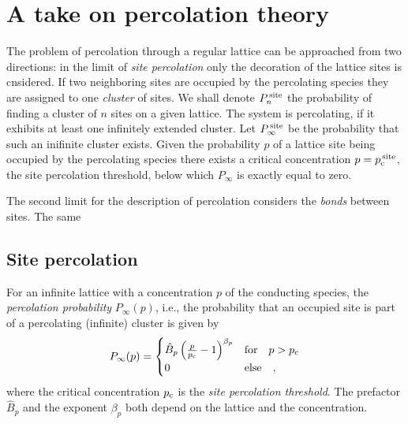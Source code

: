 \documentclass{scrartcl}
\begin{document}
\section{A take on percolation theory}

The problem of percolation through a regular lattice can be approached
from two directions: 
%
in the limit of \emph{site percolation} only the decoration of the
lattice sites is cnsidered.  If two neighboring sites are occupied by
the percolating species they are assigned to one \emph{cluster} of
sites.  We shall denote $P_{n}^{\,\textup{site}}$ the probability of
finding a cluster of $n$ sites on a given lattice.  The system is
percolating, if it exhibits at least one infinitely extended cluster.
%
Let $P_{\infty}^{\,\textup{site}}$ be the probability that such an
inifinite cluster exists.
%
Given the probability $p$ of a lattice site being occupied by the
percolating species there exists a critical concentration $p =
p_{\textup{c}}^{\,\textup{site}}$, the site percolation threshold, below
which $P_{\infty}$ is exactly equal to zero.

The second limit for the description of percolation considers the
\emph{bonds} between sites.  The same 


\subsection{Site percolation}

For an infinite lattice with a concentration $p$ of the conducting
species, the \emph{percolation probability} $P_{\infty}(p)$, i.e., the
probability that an occupied site is part of a percolating (infinite)
cluster is given by
%
\begin{align}
  P_{\infty}(p) 
  = \begin{cases}
    \hat{B}_{p}\,
    \Bigl( 
      \frac{p}{p_{\textup{c}}} - 1
    \Bigr)^{\beta_{p}}
    & \text{for}\quad p>p_{\textup{c}}
    \\
    0 & \text{else}
    \quad ,
  \end{cases}
  \label{eq:P_infty}
\end{align}
%
where the critical concentration $p_{\textup{c}}$ is the \emph{site
  percolation threshold}.  The prefactor $\hat{B}_{p}$ and the exponent
$\beta_{p}$ both depend on the lattice and the concentration.
\end{document}
